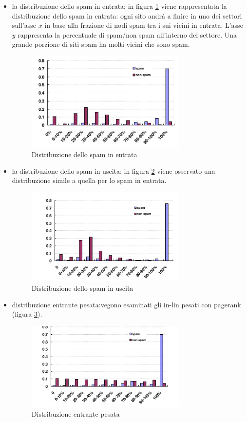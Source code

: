 \begin{itemize}
 \item la distribuzione dello spam in entrata:  in figura \ref{img:gan1} viene rappresentata la distribuzione dello spam in entrata: ogni sito andrà a finire in uno dei settori sull'asse \(x\) in base alla frazione di nodi spam tra i sui vicini in entrata. L'asse \(y\) rappresenta la percentuale di spam/non spam all'interno del settore. Una grande porzione di siti spam ha molti vicini che sono spam. 
 \begin{figure}
 \centering
\includegraphics[width=8cm]{immagini/gan/immagine1.png}
\caption{Distribuzione dello spam in entrata}
\label{img:gan1}
\end{figure}
\item la distribuzione dello spam in uscita: in figura \ref{img:gan2} viene osservato una distribuzione simile a quella per lo spam in entrata.
 \begin{figure}
 \centering
\includegraphics[width=8cm]{immagini/gan/immagine2.png}
\caption{Distribuzione dello spam in uscita}
\label{img:gan2}
\end{figure}
\item distribuzione entrante pesata:vegono esaminati gli in-lin  pesati con pagerank (figura \ref{img:gan3}).
 \begin{figure}
 \centering
\includegraphics[width=8cm]{immagini/gan/immagine3.png}
\caption{Distribuzione entrante pesata}
\label{img:gan3}
\end{figure}
\end{itemize}
